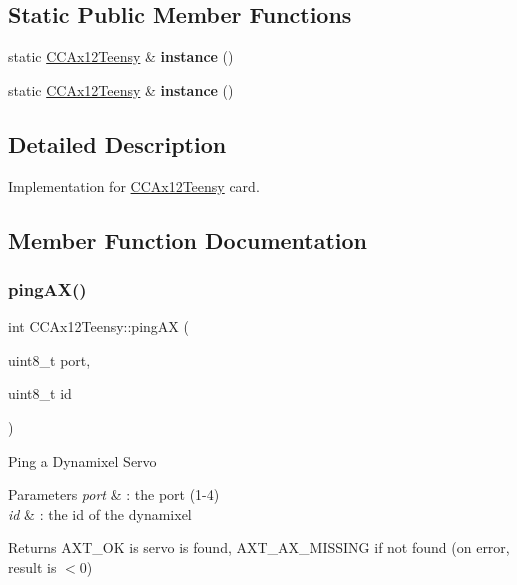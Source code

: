 \subsection*{Static Public Member Functions}
\begin{DoxyCompactItemize}
\item 
\mbox{\label{classCCAx12Teensy_af38c8b46ecf7752d5e3971484aeaac92}} 
static \hyperlink{classCCAx12Teensy}{C\+C\+Ax12\+Teensy} \& {\bfseries instance} ()
\item 
\mbox{\label{classCCAx12Teensy_af38c8b46ecf7752d5e3971484aeaac92}} 
static \hyperlink{classCCAx12Teensy}{C\+C\+Ax12\+Teensy} \& {\bfseries instance} ()
\end{DoxyCompactItemize}


\subsection{Detailed Description}
Implementation for \hyperlink{classCCAx12Teensy}{C\+C\+Ax12\+Teensy} card. 

\subsection{Member Function Documentation}
\mbox{\label{classCCAx12Teensy_a7a4be50ad46846c5a1d8a8bb80af6ce5}} 
\subsubsection{\texorpdfstring{ping\+A\+X()}{pingAX()}\hspace{0.1cm}{\footnotesize\ttfamily [1/2]}}
{\footnotesize\ttfamily int C\+C\+Ax12\+Teensy\+::ping\+AX (\begin{DoxyParamCaption}\item[{uint8\+\_\+t}]{port,  }\item[{uint8\+\_\+t}]{id }\end{DoxyParamCaption})}

Ping a Dynamixel Servo 
\begin{DoxyParams}{Parameters}
{\em port} & \+: the port (1-\/4) \\
\hline
{\em id} & \+: the id of the dynamixel \\
\hline
\end{DoxyParams}
\begin{DoxyReturn}{Returns}
A\+X\+T\+\_\+\+OK is servo is found, A\+X\+T\+\_\+\+A\+X\+\_\+\+M\+I\+S\+S\+I\+NG if not found (on error, result is $<$0) 
\end{DoxyReturn}
\mbox{\label{classCCAx12Teensy_a7a4be50ad46846c5a1d8a8bb80af6ce5}} 

